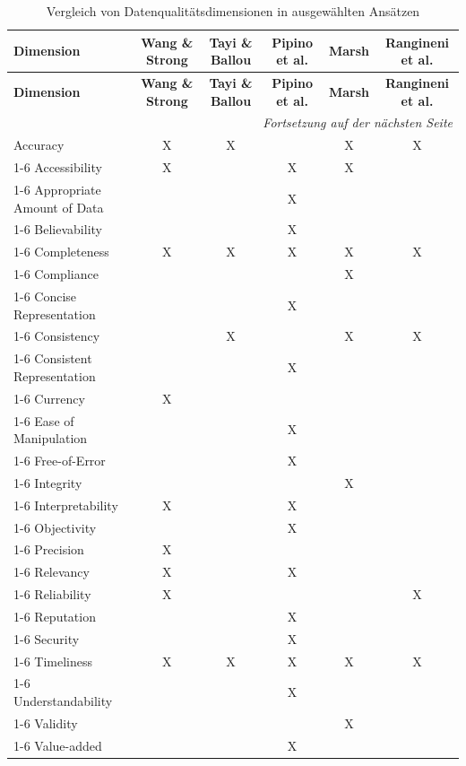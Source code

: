 \documentclass[../main.tex]{subfiles}
\begin{document}
\begin{longtable}{lccccc} 
    
\caption{Vergleich von Datenqualitätsdimensionen in ausgewählten Ansätzen} 
\label{tab:dq-dimensionen}\\ 

\toprule 
\textbf{Dimension} 
& \textbf{Wang \& Strong} 
& \textbf{Tayi \& Ballou} 
& \textbf{Pipino et al.} 
& \textbf{Marsh} 
& \textbf{Rangineni et al.} \\ 
\midrule 
\endfirsthead 
\toprule \textbf{Dimension} 
& \textbf{Wang \& Strong} 
& \textbf{Tayi \& Ballou} 
& \textbf{Pipino et al.} 
& \textbf{Marsh} 
& \textbf{Rangineni et al.} \\ 
\midrule 
\endhead

\midrule
\multicolumn{6}{r}{\textit{Fortsetzung auf der nächsten Seite}} \\ 
\endfoot 

\bottomrule 
\endlastfoot 

Accuracy & X & X & & X & X \\ 
\cmidrule(lr){1-6} 
Accessibility & X & & X & X & \\ 
\cmidrule(lr){1-6} 
Appropriate Amount of Data & & & X & & \\ 
\cmidrule(lr){1-6} 
Believability & & & X & & \\ 
\cmidrule(lr){1-6} 
Completeness & X & X & X & X & X \\ 
\cmidrule(lr){1-6} 
Compliance & & & & X & \\ 
\cmidrule(lr){1-6} 
Concise Representation & & & X & & \\ 
\cmidrule(lr){1-6} 
Consistency & & X & & X & X \\ 
\cmidrule(lr){1-6} 
Consistent Representation & & & X & & \\ 
\cmidrule(lr){1-6} 
Currency & X & & & & \\ 
\cmidrule(lr){1-6} 
Ease of Manipulation & & & X & & \\ 
\cmidrule(lr){1-6} 
Free-of-Error & & & X & & \\ 
\cmidrule(lr){1-6} 
Integrity & & & & X & \\ 
\cmidrule(lr){1-6} 
Interpretability & X & & X & & \\ 
\cmidrule(lr){1-6} 
Objectivity & & & X & & \\ 
\cmidrule(lr){1-6}
Precision & X & & & & \\ 
\cmidrule(lr){1-6} 
Relevancy & X & & X & & \\ 
\cmidrule(lr){1-6} 
Reliability & X & & & & X \\ 
\cmidrule(lr){1-6} 
Reputation & & & X & & \\ 
\cmidrule(lr){1-6} 
Security & & & X & & \\ 
\cmidrule(lr){1-6} 
Timeliness & X & X & X & X & X \\ 
\cmidrule(lr){1-6} 
Understandability & & & X & & \\ 
\cmidrule(lr){1-6} 
Validity & & & & X & \\ 
\cmidrule(lr){1-6} 
Value-added & & & X & & \\ 

\end{longtable} 
\end{document}
